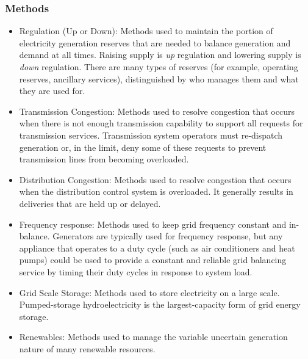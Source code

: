 \subsubsection{Methods}
\begin{itemize}
\item Regulation (Up or Down): Methods used to maintain the portion of electricity generation reserves 
that are needed to balance generation and demand at all times. Raising supply is \emph{up} regulation and lowering 
supply is \emph{down} regulation. There are many types of reserves (for example, operating reserves, ancillary services), distinguished by who manages them and what they are used for.

\item Transmission Congestion: Methods used to resolve congestion that occurs when there is not enough 
transmission capability to support all requests for transmission services. Transmission system operators 
must re-dispatch generation or, 
in the limit, deny some of these requests to prevent transmission lines from becoming overloaded.

\item Distribution Congestion:  Methods used to resolve congestion that occurs when the 
distribution control system 
is overloaded.  It generally results in deliveries that are held up or delayed.  

\item Frequency response:  Methods used to keep grid frequency constant and in-balance. 
Generators are typically used for frequency response, but any appliance that operates to a duty cycle 
(such as air conditioners and heat pumps) could be used to provide a 
constant and reliable grid balancing service by timing their duty cycles in response to system load.   

\item Grid Scale Storage:  Methods used to store electricity on a large scale. 
Pumped-storage hydroelectricity is the largest-capacity form of grid energy storage. 

\item Renewables:  Methods used to manage the variable uncertain generation nature of 
many renewable resources. 
\end{itemize}

